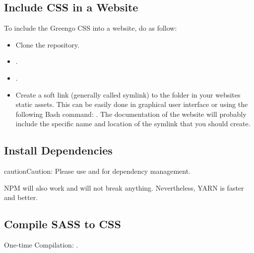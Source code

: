 \documentclass[letterpaper,10pt,english]{sphinxmanual}
\begin{document}
\subsection{Include CSS in a Website}
\label{\detokenize{websites/css:include-css-in-a-website}}\label{\detokenize{websites/css:include-css}}
To include the Greengo CSS into a website, do as follow:
\begin{itemize}
\item {} 
Clone the  repository.

\item {} 
{\hyperref[\detokenize{websites/css:install-dependencies}]{}}.

\item {} 
{\hyperref[\detokenize{websites/css:compile-sass-to-css}]{}}.

\item {} 
Create a soft link (generally called symlink) to the  folder in your websites static assets.
This can be easily done in graphical user interface or using the following Bash command: .
The documentation of the website will probably include the specific name and location of the symlink that you should create.

\end{itemize}


\subsection{Install Dependencies}
\label{\detokenize{websites/css:install-dependencies}}\label{\detokenize{websites/css:id1}}

\begin{sphinxadmonition}{caution}{Caution:}
Please use  and  for dependency management.

NPM will also work and will not break anything.
Nevertheless, YARN is faster and better.
\end{sphinxadmonition}


\subsection{Compile SASS to CSS}
\label{\detokenize{websites/css:compile-sass-to-css}}\label{\detokenize{websites/css:id2}}
One-time Compilation: .
\end{document}
